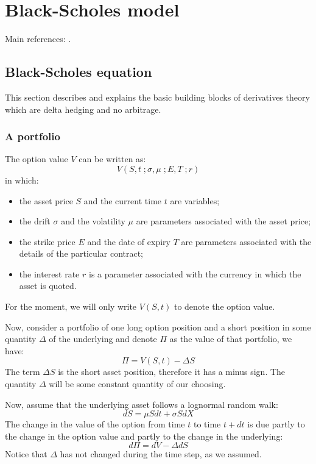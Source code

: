 \section{Black-Scholes model} 
Main references: \cite{pw_mathfinderiv_1995, pw_iqf2ed_2007}.


\subsection{Black-Scholes equation}
This section describes and explains the basic building blocks of derivatives theory which are delta hedging and no arbitrage.

\subsubsection{A portfolio}
The option value $V$ can be written as:
\begin{equation}
    V(S,t \; ; \sigma, \mu \; ; E, T \; ; r)
\end{equation}
in which:
\begin{itemize}    
    \setlength\itemsep{0em}
    \item the asset price $S$ and the current time $t$ are variables;
    \item the drift $\sigma$ and the volatility $\mu$ are parameters associated with the asset price;
    \item the strike price $E$ and the date of expiry $T$ are parameters associated with the details of the particular contract;
    \item the interest rate $r$ is a parameter associated with the currency in which the asset is quoted.
\end{itemize}
For the moment, we will only write $V(S,t)$ to denote the option value.

Now, consider a portfolio of one long option position and a short position in some quantity $\Delta$ of the underlying and denote $\Pi$ as the value of that portfolio, we have:
\begin{equation}
    \Pi = V(S,t) - \Delta S
    \label{equ:bs_000}
\end{equation}
The term $\Delta S$ is the short asset position, therefore it has a minus sign. The quantity $\Delta$ will be some constant quantity of our choosing. 

Now, assume that the underlying asset follows a lognormal random walk:
\begin{equation}
    dS = \mu S dt + \sigma S dX
\end{equation}
The change in the value of the option from time $t$ to time $t+dt$ is due partly to the change in the option value and partly to the change in the underlying:
\begin{equation}
    d\Pi = dV - \Delta dS
\end{equation}
Notice that $\Delta$ has not changed during the time step, as we assumed. 

